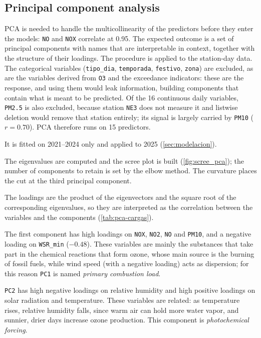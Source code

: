 \subsection{Principal component analysis}
\label{sec:pca}

PCA is needed to handle the multicollinearity of the predictors before they
enter the models: \texttt{NO} and \texttt{NOX} correlate at 0.95. The
expected outcome is a set of principal components with names that are
interpretable in context, together with the structure of their loadings. The
procedure is applied to the station-day data. The categorical variables
(\texttt{tipo\_dia}, \texttt{temporada}, \texttt{festivo}, \texttt{zona}) are
excluded, as are the variables derived from \texttt{O3} and the exceedance
indicators: these are the response, and using them would leak information,
building components that contain what is meant to be predicted. Of the 16
continuous daily variables, \texttt{PM2.5} is also excluded, because station
\texttt{NE3} does not measure it and listwise deletion would remove that
station entirely; its signal is largely carried by \texttt{PM10} ($r=0.70$).
PCA therefore runs on 15 predictors.

It is fitted on 2021--2024 only and applied to 2025 (\cref{sec:modelacion}).

The eigenvalues are computed and the scree plot is built
(\cref{fig:scree_pca}); the number of components to retain is set by the
elbow method. The curvature places the cut at the third principal component.

The loadings are the product of the eigenvectors and the square root of the
corresponding eigenvalues, so they are interpreted as the correlation between
the variables and the components (\cref{tab:pca-cargas}).

The first component has high loadings on \texttt{NOX}, \texttt{NO2},
\texttt{NO} and \texttt{PM10}, and a negative loading on \texttt{WSR\_min}
($-0.48$). These variables are mainly the substances that take part in the
chemical reactions that form ozone, whose main source is the burning of
fossil fuels, while wind speed (with a negative loading) acts as dispersion;
for this reason \texttt{PC1} is named \textit{primary combustion load}.

\texttt{PC2} has high negative loadings on relative humidity and high
positive loadings on solar radiation and temperature. These variables are
related: as temperature rises, relative humidity falls, since warm air can
hold more water vapor, and sunnier, drier days increase ozone production.
This component is \textit{photochemical forcing}.

